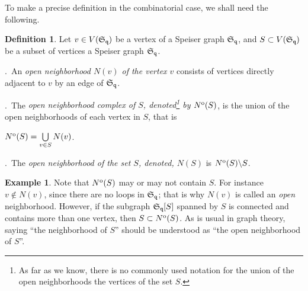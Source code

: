 \documentclass[final,3p,times]{elsarticle}
\theoremstyle{definition}
\newtheorem{definition}[theorem]{Definition}
\newtheorem{example}{Example}[section]
\begin{document}
\noindent
To make a precise definition in the combinatorial case,
we shall need the following.

\begin{definition}
\label{def:neighbors-of-sets}
Let $v\in V(\mathfrak{S}_{\tt q})$ be a vertex of a Speiser graph $\mathfrak{S}_{\tt q}$,
and $S\subset V(\mathfrak{S}_{\tt q})$ be a subset of vertices a Speiser graph $\mathfrak{S}_{\tt q}$.

.\ 
An \emph{open neighborhood $N(v)$ of the vertex $v$} consists 
of vertices directly adjacent to $v$ by an edge of $\mathfrak{S}_{\tt q}$.

.\ 
The \emph{open neighborhood complex 
of $S$, denoted\footnote{
As far as we know, there is no commonly used notation for the
union of the open neighborhoods the vertices of the set $S$.
} 
by $N^{\rm o}(S)$},
is the union of the open neighborhoods of each vertex in $S$,
that is 

\centerline{
$N^{\rm o}(S) = \bigcup\limits_{v\in S} N(v)$.
}


.\ 
The \emph{open neighborhood of the set $S$, denoted, 
$N(S)$} is $N^{\rm o}(S)\backslash S$.
\end{definition}

\begin{example}
Note that $N^{\rm o}(S)$ may or may not contain $S$. 
For instance $v\notin N(v)$,
since there are no loops in $\mathfrak{S}_{\tt q}$;
that is why $N(v)$ is called an \emph{open} neighborhood.
However, if the subgraph $\mathfrak{S}_{\tt q}[S]$ spanned by $S$ is connected 
and contains more than one vertex, then 
$S\subset N^{\rm o}(S)$.
As is usual in graph theory, saying ``the neighborhood of $S$'' 
should be understood as ``the open neighborhood of $S$''.
\end{example}
\end{document}
